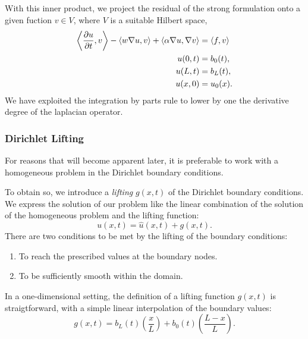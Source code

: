 \documentclass[../../main.tex]{subfiles}
\newcommand{\inner}[2]{\left<#1, #2\right>}
\begin{document}
With this inner product, we project the residual of the strong formulation onto a given fuction $v \in V$,
where $V$ is a suitable Hilbert space,
\begin{subequations}
    \begin{align}
        \label{eq:1d_fom_weak_formulation}
        \inner{\frac{\partial u}{\partial t}}{v} - \inner{w \grad u}{v} + \inner{\alpha \grad u}{\grad v} &= \inner{f}{v} \\
        u(0, t) &= b_0(t), \\
        u(L, t) &= b_L(t), \\
        u(x, 0) &= u_0(x).
    \end{align}
\end{subequations}
We have exploited the integration by parts rule to lower by one the derivative degree of the laplacian operator.

\subsubsection{Dirichlet Lifting}
\label{sec:1d_fom_heat_equation_dirichlet_lifting}
For reasons that will become apparent later, it is preferable to work with a homogeneous problem in the Dirichlet boundary conditions.

To obtain so, we introduce a \emph{lifting} $g(x,t)$ of the Dirichlet boundary conditions.
We express the solution of our problem like the linear combination of the solution of the homogeneous problem and the lifting function:
\begin{equation}
    \label{eq:1d_fom_homogeneous_plus_lifting}
    u(x,t) = \hat{u}(x,t) + g(x,t).
\end{equation}
There are two conditions to be met by the lifting of the boundary conditions:
\begin{enumerate}
    \item To reach the prescribed values at the boundary nodes.
    \item To be sufficiently smooth within the domain.
\end{enumerate}
In a one-dimensional setting, the definition of a lifting function $g(x,t)$ is straigtforward, with a simple linear interpolation of the boundary values:
\begin{equation}
    \label{eq:1d_fom_dirichlet_lifting}
    g(x,t) = b_L(t) \left(\frac{x}{L}\right) + b_0(t) \left(\frac{L - x}{L}\right).
\end{equation}
\end{document}
